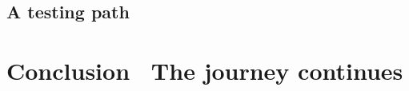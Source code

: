 \documentclass[]{ltugboat}
\begin{document}
\subsection{A testing path}
\label{sec:testing-path}

\section{Conclusion \Dash\ The journey continues}
\label{sec:journey-continues}



\makesignature
\end{document}

